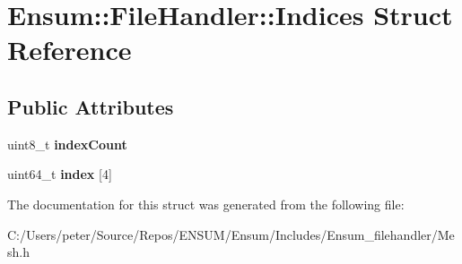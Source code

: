 \hypertarget{struct_ensum_1_1_file_handler_1_1_indices}{}\section{Ensum\+:\+:File\+Handler\+:\+:Indices Struct Reference}
\label{struct_ensum_1_1_file_handler_1_1_indices}
\subsection*{Public Attributes}
\begin{DoxyCompactItemize}
\item 
uint8\+\_\+t {\bfseries index\+Count}\hypertarget{struct_ensum_1_1_file_handler_1_1_indices_afe85a0ec09149ff55b89c06fe097486d}{}\label{struct_ensum_1_1_file_handler_1_1_indices_afe85a0ec09149ff55b89c06fe097486d}

\item 
uint64\+\_\+t {\bfseries index} \mbox{[}4\mbox{]}\hypertarget{struct_ensum_1_1_file_handler_1_1_indices_a912cc220a04acf4ba42c1fa576a41e44}{}\label{struct_ensum_1_1_file_handler_1_1_indices_a912cc220a04acf4ba42c1fa576a41e44}

\end{DoxyCompactItemize}


The documentation for this struct was generated from the following file\+:\begin{DoxyCompactItemize}
\item 
C\+:/\+Users/peter/\+Source/\+Repos/\+E\+N\+S\+U\+M/\+Ensum/\+Includes/\+Ensum\+\_\+filehandler/Mesh.\+h\end{DoxyCompactItemize}

